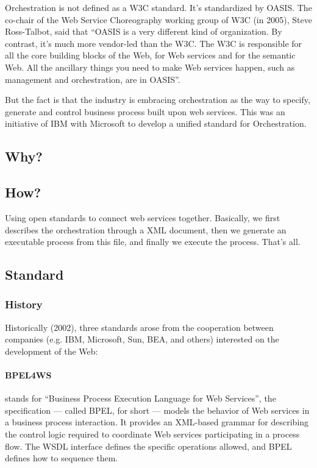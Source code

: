 \documentclass[11pt,a4paper]{article}
\begin{document}
Orchestration is not defined as a W3C standard. It's standardized by OASIS. The co-chair of the Web Service Choreography working group of W3C (in 2005), Steve Ross-Talbot, said that ``OASIS is a very different kind of organization. By contrast, it's much more vendor-led than the W3C. The W3C is responsible for all the core building blocks of the Web, for Web services and for the semantic Web. All the ancillary things you need to make Web services happen, such as management and orchestration, are in OASIS''.

But the fact is that the industry is embracing orchestration as the way to specify, generate and control business process built upon web services. This was an initiative of IBM with Microsoft to develop a unified standard for Orchestration.

\subsection{Why?}


\subsection{How?}
Using open standards to connect web services together.
Basically, we first describes the orchestration through a XML document, then we generate an executable process from this file, and finally we execute the process.
That's all.

\subsection{Standard}
\subsubsection{History}

Historically (2002), three standards arose from the cooperation between companies (e.g. IBM, Microsoft, Sun, BEA, and others) interested on the development of the Web:

\paragraph{BPEL4WS} 
stands for ``Business Process Execution Language for Web Services'', the specification — called BPEL, for short — models the behavior of Web services in a business process interaction. It provides an XML-based grammar for describing the control logic required to coordinate Web services participating in a process flow. The WSDL interface defines the specific operations allowed, and BPEL defines how to sequence them.
\end{document}
